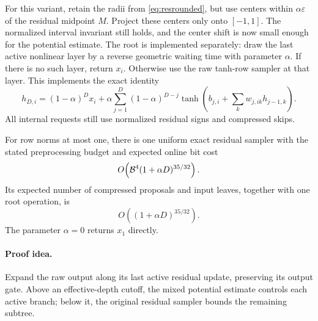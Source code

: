 For this variant, retain the radii from \eqref{eq:resrounded},
but use centers within $\alpha\varepsilon$ of the residual
midpoint $M$. Project these centers only onto $[-1,1]$.
The normalized interval invariant still holds, and the center
shift is now small enough for the potential estimate.
The root is implemented separately: draw the last active
nonlinear layer by a reverse geometric waiting time with parameter
$\alpha$. If there is no such layer, return $x_i$.
Otherwise use the raw tanh-row sampler at that layer.
This implements the exact identity
\begin{equation}\label{eq:resrawrootidentity}
h_{D,i}=(1-\alpha)^D x_i+
\alpha\sum_{j=1}^D(1-\alpha)^{D-j}
 \tanh\!\left(b_{j,i}+\sum_kw_{j,ik}h_{j-1,k}\right).
\end{equation}
All internal requests still use normalized residual signs and
compressed skips.

\begin{theorem}
\label{thm:residualfused}
For row norms at most one, there is one uniform exact residual
sampler with the stated preprocessing budget and expected online
bit cost
\[
O\!\left(\mathcal B^4(1+\alpha D)^{35/32}\right).
\]
Its expected number of compressed proposals and input leaves,
together with one root operation, is
\begin{equation}\label{eq:residualfused}
O((1+\alpha D)^{35/32}).
\end{equation}
The parameter $\alpha=0$ returns $x_1$ directly.
\end{theorem}
\paragraph{Proof idea.}
Expand the raw output along its last active residual update, preserving its
output gate. Above an effective-depth cutoff, the mixed potential estimate
controls each active branch; below it, the original residual sampler bounds
the remaining subtree.

